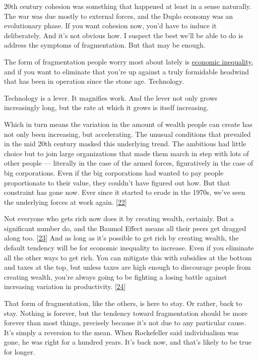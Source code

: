 20th century cohesion was something that happened at least in a
sense naturally.  The war was due mostly to external forces, and
the Duplo economy was an evolutionary phase.  If you want cohesion
now, you'd have to induce it deliberately.  And it's not obvious
how.  I suspect the best we'll be able to do is address the symptoms
of fragmentation.  But that may be enough.

The form of fragmentation people worry most about lately is \href{http://www.paulgraham.com/ineq.html}{\underline{economic inequality}}, and if you want to eliminate
that you're up against a truly formidable headwind that has
been in operation since the stone age. Technology.

Technology is
a lever. It magnifies work.  And the lever not only grows increasingly
long, but the rate at which it grows is itself increasing.

Which in turn means the variation in the amount of wealth people
can create has not only been increasing, but accelerating.  The
unusual conditions that prevailed in the mid 20th century masked
this underlying trend.  The ambitious had little choice but to join
large organizations that made them march in step with lots of other
people --- literally in the case of the armed forces, figuratively
in the case of big corporations. Even if the big corporations had
wanted to pay people proportionate to their value, they couldn't
have figured out how.  But that constraint has gone now.  Ever since
it started to erode in the 1970s, we've seen the underlying forces
at work again.
[\href{\#f22n}{22}]

Not everyone who gets rich now does it by creating wealth, certainly.
But a significant number do, and the Baumol Effect means all their
peers get dragged along too.
[\href{\#f23n}{23}]
And as long as it's possible to
get rich by creating wealth, the default tendency will be for
economic inequality to increase.  Even if you eliminate all the
other ways to get rich.  You can mitigate this with subsidies at
the bottom and taxes at the top, but unless taxes are high enough
to discourage people from creating wealth, you're always going to
be fighting a losing battle against increasing variation in
productivity.
[\href{\#f24n}{24}]

That form of fragmentation, like the others, is here to stay.  Or
rather, back to stay.  Nothing is forever, but the tendency toward
fragmentation should be more forever than most things, precisely
because it's not due to any particular cause.  It's simply a reversion
to the mean. When Rockefeller said individualism was gone, he was
right for a hundred years.  It's back now, and that's likely to be
true for longer.

